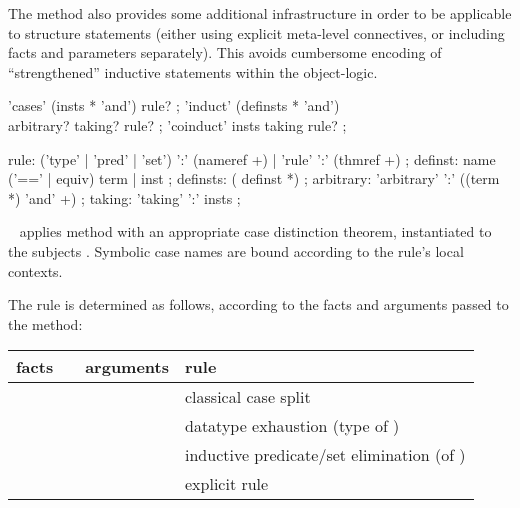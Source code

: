\begin{isabellebody}
\begin{isamarkuptext}
  The \hyperlink{method.induct}{\mbox{}} method also provides some additional
  infrastructure in order to be applicable to structure statements
  (either using explicit meta-level connectives, or including facts
  and parameters separately).  This avoids cumbersome encoding of
  ``strengthened'' inductive statements within the object-logic.

  \begin{rail}
    'cases' (insts * 'and') rule?
    ;
    'induct' (definsts * 'and') \\ arbitrary? taking? rule?
    ;
    'coinduct' insts taking rule?
    ;

    rule: ('type' | 'pred' | 'set') ':' (nameref +) | 'rule' ':' (thmref +)
    ;
    definst: name ('==' | equiv) term | inst
    ;
    definsts: ( definst *)
    ;
    arbitrary: 'arbitrary' ':' ((term *) 'and' +)
    ;
    taking: 'taking' ':' insts
    ;
  \end{rail}

  \begin{description}

  \item \hyperlink{method.cases}{\mbox{}}~ applies method \hyperlink{method.rule}{\mbox{}} with an appropriate case distinction theorem, instantiated to
  the subjects .  Symbolic case names are bound according
  to the rule's local contexts.

  The rule is determined as follows, according to the facts and
  arguments passed to the \hyperlink{method.cases}{\mbox{}} method:

  \medskip
  \begin{tabular}{llll}
    facts           &                 & arguments   & rule \\\hline
                    & \hyperlink{method.cases}{\mbox{\isa{cases}}} &             & classical case split \\
                    & \hyperlink{method.cases}{\mbox{\isa{cases}}} & \isa{t}   & datatype exhaustion (type of \isa{t}) \\
    \isa{{\isachardoublequote}{\isasymturnstile}\ A\ t{\isachardoublequote}} & \hyperlink{method.cases}{\mbox{\isa{cases}}} & \isa{{\isachardoublequote}{\isasymdots}{\isachardoublequote}} & inductive predicate/set elimination (of \isa{A}) \\
    \isa{{\isachardoublequote}{\isasymdots}{\isachardoublequote}}     & \hyperlink{method.cases}{\mbox{\isa{cases}}} & \isa{{\isachardoublequote}{\isasymdots}\ rule{\isacharcolon}\ R{\isachardoublequote}} & explicit rule \isa{R} \\
  \end{tabular}
  \medskip


\end{description}
\end{isamarkuptext}
\end{isabellebody}
